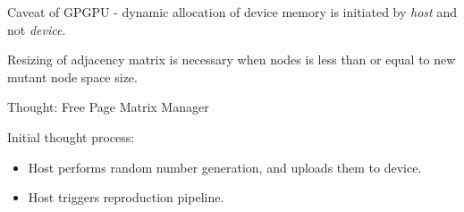 \documentclass{article}
\begin{document}
Caveat of GPGPU - dynamic allocation of device memory is initiated by \textit{host} and
not \textit{device}.

Resizing of adjacency matrix is necessary when  nodes is less than or equal
to new mutant node space size.

Thought:  Free Page Matrix Manager

Initial thought process:
\begin{itemize}
\item Host performs random number generation, and uploads them to device.
\item Host triggers reproduction pipeline. 
\end{itemize}
\end{document}
